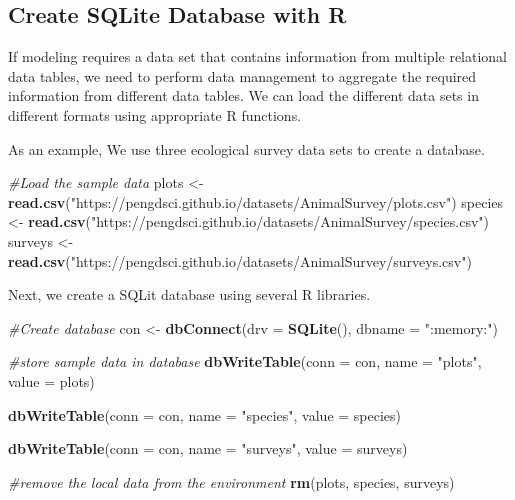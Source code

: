 \documentclass[
]{book}
\newenvironment{Shaded}{\begin{snugshade}}{\end{snugshade}}
\newcommand{\AttributeTok}[1]{\textcolor[rgb]{0.13,0.29,0.53}{#1}}
\newcommand{\CommentTok}[1]{\textcolor[rgb]{0.56,0.35,0.01}{\textit{#1}}}
\newcommand{\FunctionTok}[1]{\textcolor[rgb]{0.13,0.29,0.53}{\textbf{#1}}}
\newcommand{\NormalTok}[1]{#1}
\newcommand{\OtherTok}[1]{\textcolor[rgb]{0.56,0.35,0.01}{#1}}
\newcommand{\StringTok}[1]{\textcolor[rgb]{0.31,0.60,0.02}{#1}}
\begin{document}
\hypertarget{create-sqlite-database-with-r}{%
\subsection{Create SQLite Database with R}\label{create-sqlite-database-with-r}}

If modeling requires a data set that contains information from multiple relational data tables, we need to perform data management to aggregate the required information from different data tables. We can load the different data sets in different formats using appropriate R functions.

As an example, We use three ecological survey data sets to create a database.

\begin{Shaded}
\begin{Highlighting}[]
\CommentTok{\#Load the sample data}
\NormalTok{plots }\OtherTok{\textless{}{-}} \FunctionTok{read.csv}\NormalTok{(}\StringTok{"https://pengdsci.github.io/datasets/AnimalSurvey/plots.csv"}\NormalTok{)}
\NormalTok{species }\OtherTok{\textless{}{-}} \FunctionTok{read.csv}\NormalTok{(}\StringTok{"https://pengdsci.github.io/datasets/AnimalSurvey/species.csv"}\NormalTok{)}
\NormalTok{surveys }\OtherTok{\textless{}{-}} \FunctionTok{read.csv}\NormalTok{(}\StringTok{"https://pengdsci.github.io/datasets/AnimalSurvey/surveys.csv"}\NormalTok{)}
\end{Highlighting}
\end{Shaded}

Next, we create a SQLit database using several R libraries.

\begin{Shaded}
\begin{Highlighting}[]
\CommentTok{\#Create database}
\NormalTok{con }\OtherTok{\textless{}{-}} \FunctionTok{dbConnect}\NormalTok{(}\AttributeTok{drv =} \FunctionTok{SQLite}\NormalTok{(),}
                 \AttributeTok{dbname =} \StringTok{":memory:"}\NormalTok{)}

\CommentTok{\#store sample data in database}
\FunctionTok{dbWriteTable}\NormalTok{(}\AttributeTok{conn =}\NormalTok{ con, }
             \AttributeTok{name =} \StringTok{"plots"}\NormalTok{,}
             \AttributeTok{value =}\NormalTok{ plots)}

\FunctionTok{dbWriteTable}\NormalTok{(}\AttributeTok{conn =}\NormalTok{ con, }
             \AttributeTok{name =} \StringTok{"species"}\NormalTok{,}
             \AttributeTok{value =}\NormalTok{ species)}

\FunctionTok{dbWriteTable}\NormalTok{(}\AttributeTok{conn =}\NormalTok{ con, }
             \AttributeTok{name =} \StringTok{"surveys"}\NormalTok{,}
             \AttributeTok{value =}\NormalTok{ surveys)}
 
\CommentTok{\#remove the local data from the environment}
\FunctionTok{rm}\NormalTok{(plots, species, surveys)}
\end{Highlighting}
\end{Shaded}
\end{document}
